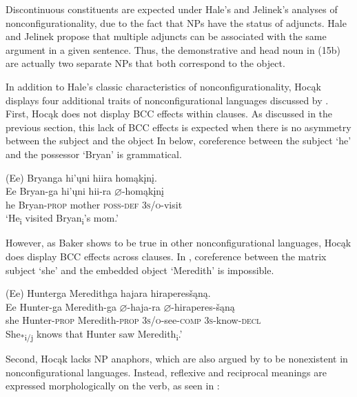 \documentclass[output=paper]{LSP/langsci}
\begin{document}
Discontinuous constituents are expected under Hale's  and Jelinek's  analyses of nonconfigurationality, due to the fact that NPs have the status of adjuncts. Hale and Jelinek propose that multiple adjuncts can be associated with the same argument in a given sentence. Thus, the demonstrative and head noun in (15b) are actually two separate NPs that both correspond to the object.

In addition to Hale's  classic characteristics of nonconfigurationality, Hocąk displays four additional traits of nonconfigurational languages discussed by \citet{Baker1996}. First, Hocąk does not display BCC effects within clauses.  As discussed in the previous section, this lack of BCC effects is expected when there is no asymmetry between the subject and the object In  below, coreference between the subject `he' and the possessor `Bryan' is grammatical.

\begin{exe}
\ex	
\glll (Ee) 	Bryanga 			hi'\k{u}ni 	hiira 				homąk\k{i}n\k{i}. \\
Ee 		Bryan-ga 		hi'\k{u}ni 	hii-ra 			$\varnothing$-homąk\k{i}n\k{i} \\
he 		Bryan-\textsc{prop} mother 	\textsc{poss-def} 	\textsc{3s/o}-visit  \\
\trans `He\textsubscript{i} visited Bryan\textsubscript{i}'s mom.'
\end{exe}
However, as Baker shows to be true in other nonconfigurational languages, Hocąk does display BCC effects across clauses. In , coreference between the matrix subject `she' and the embedded object `Meredith' is impossible.

\begin{exe}
\ex	
\glll (Ee) 	Hunterga 	Meredithga		hajara 						hiraperes\v{s}ąną. \\
 Ee 		Hunter-ga 	Meredith-ga 		$\varnothing$-haja-ra 				$\varnothing$-hiraperes-\v{s}ąną \\
she 		Hunter-\textsc{prop} 	Meredith-\textsc{prop} 	\textsc{3s/o}-see-\textsc{comp} 	\textsc{3s}-know-\textsc{decl}  \\
\trans She\textsubscript{*i/j} knows that Hunter saw Meredith\textsubscript{i}.'
\end{exe}	

Second, Hocąk lacks NP anaphors, which are also argued by \citet{Baker1996} to be nonexistent in nonconfigurational languages. Instead, reflexive and reciprocal meanings are expressed morphologically on the verb, as seen in :
\end{document}
